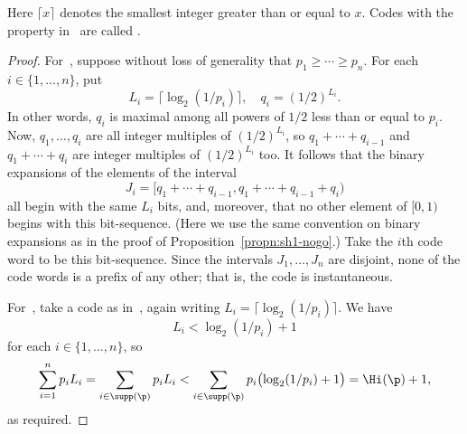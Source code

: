 Here $\lceil x \rceil$ denotes the smallest integer greater than or equal
to $x$.  Codes with the property in~ are called
.

\begin{proof}
For~, suppose without loss of generality that $p_1
\geq \cdots \geq p_n$.  For each $i \in \{1, \ldots, n\}$, put 
\[
L_i
=
\lceil \log_2(1/p_i) \rceil,
\quad
q_i 
=
(1/2)^{L_i}.
\]
In other words, $q_i$ is maximal among all powers of $1/2$ less than or
equal to $p_i$.  Now, $q_1, \ldots, q_i$ are all integer multiples of
$(1/2)^{L_i}$, so $q_1 + \cdots + q_{i - 1}$ and $q_1 + \cdots + q_i$ are
integer multiples of $(1/2)^{L_i}$ too.  It follows that the binary
expansions of the elements of the interval
\[
J_i = [q_1 + \cdots + q_{i - 1}, q_1 + \cdots + q_{i - 1} + q_i)
\]
all begin with the same $L_i$ bits, and, moreover, that no other element of
$[0, 1)$ begins with this bit-sequence.  (Here we use the same convention on
binary expansions as in the proof of Proposition~\ref{propn:sh1-nogo}.)
Take the $i$th code word to be this bit-sequence.  Since the intervals
$J_1, \ldots, J_n$ are disjoint, none of the code words is a prefix of any
other; that is, the code is instantaneous.

For~, take a code as in~,
again writing $L_i = \lceil \log_2(1/p_i)\rceil$.  We have
\[
L_i < \log_2(1/p_i) + 1
\]
for each $i \in \{1, \ldots, n\}$, so
\[
\sum_{i = 1}^n p_i L_i
=
\sum_{i \in \supp(\p)} p_i L_i
<
\sum_{i \in \supp(\p)} p_i \bigl( \log_2(1/p_i) + 1 \bigr)
=
\Hi(\p) + 1,
\]
as required.
\end{proof}

